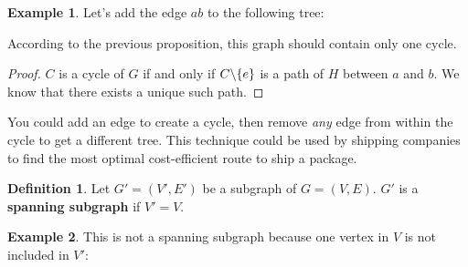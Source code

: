 \documentclass[]{article}
\theoremstyle{definition}
\newtheorem*{defn}{Definition}
\newtheorem{ex}{Example}[section]
\DeclarePairedDelimiter{\set}{\lbrace}{\rbrace}
\begin{document}
			\begin{ex}
				Let's add the edge $ab$ to the following tree:
				\begin{center}
				\end{center}

				According to the previous proposition, this graph should contain only one cycle.
			\end{ex}

			\begin{proof}
				$C$ is a cycle of $G$ if and only if $C \backslash \set{e}$ is a path of $H$ between $a$ and $b$. We know that there exists a unique such path.
			\end{proof}

			You could add an edge to create a cycle, then remove \emph{any} edge from within the cycle to get a different tree. This technique could be used by shipping companies to find the most optimal cost-efficient route to ship a package.

			\begin{defn}
				Let $G' = (V', E')$ be a subgraph of $G = (V, E)$. $G'$ is a \textbf{spanning subgraph} if $V' = V$.
			\end{defn}

			\begin{ex}
				This is not a spanning subgraph because one vertex in $V$ is not included in $V'$:
				\begin{center}
				\end{center}
			\end{ex}
\end{document}
